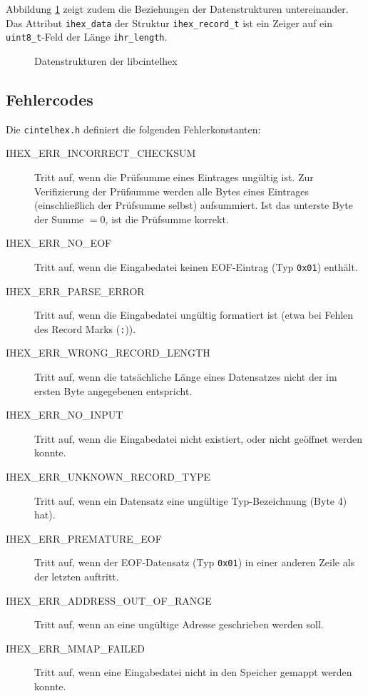 \documentclass[11pt]{scrartcl}
\begin{document}
Abbildung \ref{lcih_datastructs} zeigt zudem die Beziehungen der Datenstrukturen untereinander. Das Attribut \texttt{ihex\_data} der Struktur \texttt{ihex\_record\_t} ist ein Zeiger auf ein \texttt{uint8\_t}-Feld der Länge \texttt{ihr\_length}.

\begin{figure}[!htb]
	\begin{center}
		
	\end{center}
	\caption{Datenstrukturen der libcintelhex}
	\label{lcih_datastructs}
\end{figure}

\subsection{Fehlercodes}

Die \texttt{cintelhex.h} definiert die folgenden Fehlerkonstanten:

\begin{description}
	\item[IHEX\_ERR\_INCORRECT\_CHECKSUM] Tritt auf, wenn die Prüfsumme eines Eintrages ungültig ist. Zur Verifizierung der Prüfsumme werden alle Bytes eines Eintrages (einschließlich der Prüfsumme selbst) aufsummiert. Ist das unterste Byte der Summe $=0$, ist die Prüfsumme korrekt.
	\item[IHEX\_ERR\_NO\_EOF] Tritt auf, wenn die Eingabedatei keinen EOF-Eintrag (Typ \texttt{0x01}) enthält.
	\item[IHEX\_ERR\_PARSE\_ERROR] Tritt auf, wenn die Eingabedatei ungültig formatiert ist (etwa bei Fehlen des Record Marks (\texttt{:})).
	\item[IHEX\_ERR\_WRONG\_RECORD\_LENGTH] Tritt auf, wenn die tatsächliche Länge eines Datensatzes nicht der im ersten Byte angegebenen entspricht.
	\item[IHEX\_ERR\_NO\_INPUT] Tritt auf, wenn die Eingabedatei nicht existiert, oder nicht geöffnet werden konnte.
	\item[IHEX\_ERR\_UNKNOWN\_RECORD\_TYPE] Tritt auf, wenn ein Datensatz eine ungültige Typ-Bezeichnung (Byte 4) hat).
	\item[IHEX\_ERR\_PREMATURE\_EOF] Tritt auf, wenn der EOF-Datensatz (Typ \texttt{0x01}) in einer anderen Zeile als der letzten auftritt.
	\item[IHEX\_ERR\_ADDRESS\_OUT\_OF\_RANGE] Tritt auf, wenn an eine ungültige Adresse geschrieben werden soll.
	\item[IHEX\_ERR\_MMAP\_FAILED] Tritt auf, wenn eine Eingabedatei nicht in den Speicher gemappt werden konnte.
\end{description}
\end{document}

